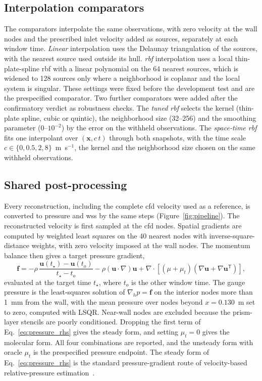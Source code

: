 \documentclass[12pt,a4paper]{article}
\newcommand{\CFD}{\ac{cfd}\xspace}
\newcommand{\WSS}{\ac{wss}\xspace}
\newcommand{\RBF}{\ac{rbf}\xspace}
\newcommand{\RBFcap}{\Ac{rbf}\xspace}
\theoremstyle{definition}
\numberwithin{equation}{section}
\begin{document}
\subsection{Interpolation comparators}
\label{sec:interpolation}
The comparators interpolate the same observations, with zero velocity at the wall nodes and the prescribed inlet velocity added as sources, separately at each window time. \emph{Linear} interpolation uses the Delaunay triangulation of the sources, with the nearest source used outside its hull. \emph{\RBFcap} interpolation uses a local thin-plate-spline \RBF with a linear polynomial on the 64 nearest sources, which is widened to 128 sources only where a neighborhood is coplanar and the local system is singular. These settings were fixed before the development test and are the prespecified comparator. Two further comparators were added after the confirmatory verdict as robustness checks. The \emph{tuned \RBF} selects the kernel (thin-plate spline, cubic or quintic), the neighborhood size (32--256) and the smoothing parameter ($0$--$10^{-2}$) by the error on the withheld observations. The \emph{space-time \RBF} fits one interpolant over $(\mathbf x, c\,t)$ through both snapshots, with the time scale $c\in\{0,0.5,2,8\}$~m~s$^{-1}$, the kernel and the neighborhood size chosen on the same withheld observations.

\subsection{Shared post-processing}
\label{sec:postprocessing}
Every reconstruction, including the complete \CFD velocity used as a reference, is converted to pressure and \WSS by the same steps (Figure~\ref{fig:pipeline}). The reconstructed velocity is first sampled at the \CFD nodes. Spatial gradients are computed by weighted least squares on the 40 nearest nodes with inverse-square-distance weights, with zero velocity imposed at the wall nodes. The momentum balance then gives a target pressure gradient,
\begin{equation}
\mathbf f=-\rho\,\frac{\mathbf u(t_\star)-\mathbf u(t_o)}{t_\star-t_o}
-\rho(\mathbf u\cdot\nabla)\mathbf u
+\nabla\cdot\left[(\mu+\mu_t)(\nabla\mathbf u+\nabla\mathbf u^{\mathsf T})\right],
\label{eq:pressure_rhs}
\end{equation}
evaluated at the target time $t_\star$, where $t_o$ is the other window time. The gauge pressure is the least-squares solution of $\nabla_h p=\mathbf f$ on the interior nodes more than 1~mm from the wall, with the mean pressure over nodes beyond $x=0.130$~m set to zero, computed with LSQR. Near-wall nodes are excluded because the prism-layer stencils are poorly conditioned. Dropping the first term of Eq.~\eqref{eq:pressure_rhs} gives the steady form, and setting $\mu_t=0$ gives the molecular form. All four combinations are reported, and the unsteady form with oracle $\mu_t$ is the prespecified pressure endpoint. The steady form of Eq.~\eqref{eq:pressure_rhs} is the standard pressure-gradient route of velocity-based relative-pressure estimation~\cite{bertoglio2018relative}.
\end{document}
